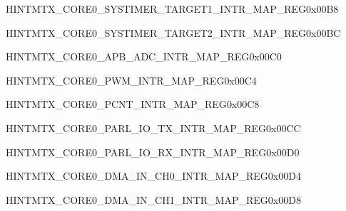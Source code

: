 \begin{register}{H}{INTMTX\_CORE0\_SYSTIMER\_TARGET1\_INTR\_MAP\_REG}{0x00B8}\label{regdesc:INTMTXCORE0SYSTIMERTARGET1INTRMAPREG}
\end{register}\vspace{-3em}

\begin{register}{H}{INTMTX\_CORE0\_SYSTIMER\_TARGET2\_INTR\_MAP\_REG}{0x00BC}\label{regdesc:INTMTXCORE0SYSTIMERTARGET2INTRMAPREG}
\end{register}\vspace{-3em}


\begin{register}{H}{INTMTX\_CORE0\_APB\_ADC\_INTR\_MAP\_REG}{0x00C0}\label{regdesc:INTMTXCORE0APBADCINTRMAPREG}
\end{register}\vspace{-3em}


\begin{register}{H}{INTMTX\_CORE0\_PWM\_INTR\_MAP\_REG}{0x00C4}\label{regdesc:INTMTXCORE0PWMINTRMAPREG}
\end{register}\vspace{-3em}


\begin{register}{H}{INTMTX\_CORE0\_PCNT\_INTR\_MAP\_REG}{0x00C8}\label{regdesc:INTMTXCORE0PCNTINTRMAPREG}
\end{register}\vspace{-3em}


\begin{register}{H}{INTMTX\_CORE0\_PARL\_IO\_TX\_INTR\_MAP\_REG}{0x00CC}\label{regdesc:INTMTXCORE0PARLIOTXINTRMAPREG}
\end{register}\vspace{-3em}


\begin{register}{H}{INTMTX\_CORE0\_PARL\_IO\_RX\_INTR\_MAP\_REG}{0x00D0}\label{regdesc:INTMTXCORE0PARLIORXINTRMAPREG}
\end{register}\vspace{-3em}


\begin{register}{H}{INTMTX\_CORE0\_DMA\_IN\_CH0\_INTR\_MAP\_REG}{0x00D4}\label{regdesc:INTMTXCORE0DMAINCH0INTRMAPREG}
\end{register}\vspace{-3em}


\begin{register}{H}{INTMTX\_CORE0\_DMA\_IN\_CH1\_INTR\_MAP\_REG}{0x00D8}\label{regdesc:INTMTXCORE0DMAINCH1INTRMAPREG}
\end{register}\vspace{-3em}


